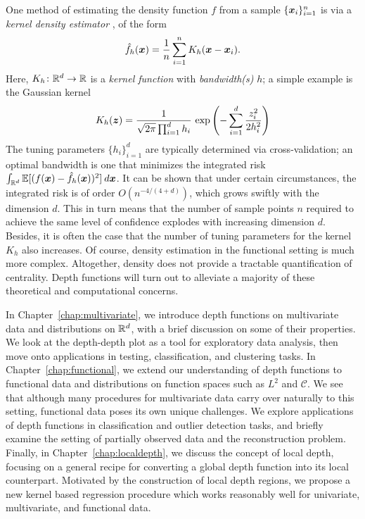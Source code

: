 One method of estimating the density function $f$ from a sample $\{\bm{x}_i\}_{i
= 1}^n$ is via a \emph{kernel density estimator} \parencite{wasserman-2005},
of the form
\begin{equation}
    \hat{f}_{h}(\bm{x}) = \frac{1}{n} \sum_{i = 1}^n K_h(\bm{x} - \bm{x}_i).
\end{equation}
Here, $K_h\colon \mathbb{R}^d \to \mathbb{R}$ is a \emph{kernel function} with
\emph{bandwidth(s)} $h$; a simple example is the Gaussian kernel
\begin{equation}
    K_h(\bm{z}) = \frac{1}{\sqrt{2\pi}\prod_{i = 1}^d h_i}\, \exp\left(-\sum_{i = 1}^d \frac{z_i^2}{2h_i^2}\right)
\end{equation}
The tuning parameters $\{h_i\}_{i = 1}^d$ are typically determined via
cross-validation; an optimal bandwidth is one that minimizes the integrated
risk $\int_{\mathbb{R}^d}\operatorname{\mathbb{E}}[(f(\bm{x}) - \hat{f}_h(\bm{x}))^2]\:d\bm{x}$.
It can be shown that under certain circumstances, the integrated risk is of
order $O(n^{-4/(4 + d)})$, which grows swiftly with the dimension $d$.
This in turn means that the number of sample points $n$ required to achieve
the same level of confidence explodes with increasing dimension $d$.
Besides, it is often the case that the number of tuning parameters for the
kernel $K_h$ also increases.
Of course, density estimation in the functional setting is much more complex.
Altogether, density does not provide a tractable quantification of centrality.
Depth functions will turn out to alleviate a majority of these theoretical and
computational concerns.


In Chapter~\ref{chap:multivariate}, we introduce depth functions on
multivariate data and distributions on $\mathbb{R}^d$, with a brief discussion on some
of their properties.
We look at the depth-depth plot as a tool for exploratory data analysis, then
move onto applications in testing, classification, and clustering tasks.
In Chapter~\ref{chap:functional}, we extend our understanding of depth
functions to functional data and distributions on function spaces such as
$L^2$ and $\mathcal{C}$.
We see that although many procedures for multivariate data carry over
naturally to this setting, functional data poses its own unique challenges.
We explore applications of depth functions in classification and outlier
detection tasks, and briefly examine the setting of partially observed data
and the reconstruction problem.
Finally, in Chapter~\ref{chap:localdepth}, we discuss the concept of local
depth, focusing on a general recipe for converting a global depth function
into its local counterpart.
Motivated by the construction of local depth regions, we propose a new kernel
based regression procedure which works reasonably well for univariate,
multivariate, and functional data.
